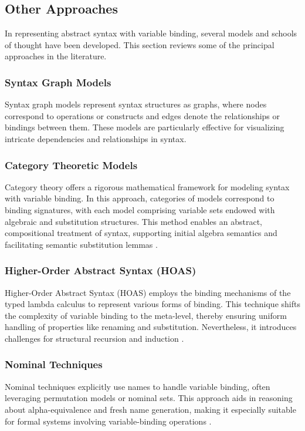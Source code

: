 \documentclass[a4paper,UKenglish,cleveref,autoref,thm-restate]{lipics-v2021}
\begin{document}
\subsection{Other Approaches}
In representing abstract syntax with variable binding, several models and
schools of thought have been developed. This section reviews some of the
principal approaches in the literature.

\subsubsection{Syntax Graph Models}
Syntax graph models represent syntax structures as graphs, where nodes
correspond to operations or constructs and edges denote the relationships or
bindings between them. These models are particularly effective for visualizing
intricate dependencies and relationships in syntax.

\subsubsection{Category Theoretic Models}
Category theory offers a rigorous mathematical framework for modeling syntax
with variable binding. In this approach, categories of models correspond to
binding signatures, with each model comprising variable sets endowed with
algebraic and substitution structures. This method enables an abstract,
compositional treatment of syntax, supporting initial algebra semantics and
facilitating semantic substitution lemmas \cite{fiore99cat}.

\subsubsection{Higher-Order Abstract Syntax (HOAS)}
Higher-Order Abstract Syntax (HOAS) employs the binding mechanisms of the typed
lambda calculus to represent various forms of binding. This technique shifts the
complexity of variable binding to the meta-level, thereby ensuring uniform
handling of properties like renaming and substitution. Nevertheless, it
introduces challenges for structural recursion and induction \cite{gabbay02hoas}.

\subsubsection{Nominal Techniques}
Nominal techniques explicitly use names to handle variable binding, often
leveraging permutation models or nominal sets. This approach aids in reasoning
about alpha-equivalence and fresh name generation, making it especially suitable
for formal systems involving variable-binding operations \cite{pitts16nominal}.
\end{document}
